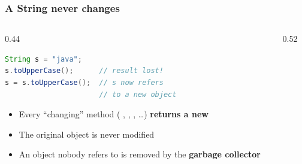 \documentclass[aspectratio=169,10pt,compress]{beamer}
\begin{document}
\begin{frame}[t,fragile] \frametitle{A String never changes}
  \begin{columns}[T]
    \begin{column}{0.44\textwidth}


\begin{lstlisting}[style=codesnippet, language=Java]
String s = "java";
s.toUpperCase();      // result lost!
s = s.toUpperCase();  // s now refers
                      // to a new object
\end{lstlisting}



	\begin{itemize}\small
		\item 
		Every ``changing'' method (
		, 
		, 
		, \dots)
              \textbf{returns a new} 

		\item The original object is never modified

		\item An object nobody refers to is removed by the \textbf{garbage collector}
	\end{itemize}
	
    \end{column}
    \begin{column}{0.52\textwidth}
    
      \begin{center}
\end{center}
\end{column}
\end{columns}
\end{frame}
\end{document}
